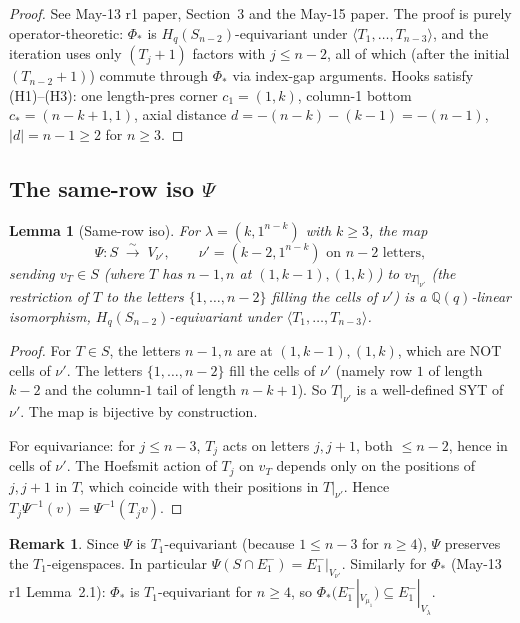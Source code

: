 \documentclass[11pt]{article}
\newtheorem{lemma}[theorem]{Lemma}
\theoremstyle{definition}
\newtheorem{remark}[theorem]{Remark}
\begin{document}
\begin{proof}
See May-13 r1 paper, Section~3 and the May-15 paper.  The proof is
purely operator-theoretic: $\Phi_*$ is $H_q(S_{n-2})$-equivariant under
$\langle T_1, \ldots, T_{n-3}\rangle$, and the iteration uses only
$(T_j+1)$ factors with $j \le n - 2$, all of which (after the initial
$(T_{n-2}+1)$) commute through $\Phi_*$ via index-gap arguments.
Hooks satisfy (H1)--(H3): one length-pres corner $c_1 = (1, k)$,
column-1 bottom $c_* = (n-k+1, 1)$, axial distance
$d = -(n - k) - (k - 1) = -(n - 1)$, $|d| = n - 1 \ge 2$ for $n \ge 3$.
\end{proof}

\subsection{The same-row iso $\Psi$}\label{sec:Psi}

\begin{lemma}[Same-row iso]\label{lem:Psi-iso}
For $\lambda = (k, 1^{n-k})$ with $k \ge 3$, the map
\[
   \Psi: S \;\xrightarrow{\sim}\; V_{\nu'}, \qquad \nu' = (k - 2, 1^{n-k})
   \text{ on } n - 2 \text{ letters},
\]
sending $v_T \in S$ (where $T$ has $n-1, n$ at $(1, k-1), (1, k)$) to
$v_{T|_{\nu'}}$ (the restriction of $T$ to the letters $\{1, \ldots, n-2\}$
filling the cells of $\nu'$) is a $\mathbb{Q}(q)$-linear isomorphism,
$H_q(S_{n-2})$-equivariant under $\langle T_1, \ldots, T_{n-3}\rangle$.
\end{lemma}

\begin{proof}
For $T \in S$, the letters $n-1, n$ are at $(1, k-1), (1, k)$, which are
NOT cells of $\nu'$.  The letters $\{1, \ldots, n-2\}$ fill the cells
of $\nu'$ (namely row $1$ of length $k - 2$ and the column-$1$ tail of
length $n - k + 1$).  So $T|_{\nu'}$ is a well-defined SYT of $\nu'$.
The map is bijective by construction.

For equivariance: for $j \le n - 3$, $T_j$ acts on letters $j, j+1$,
both $\le n - 2$, hence in cells of $\nu'$.  The Hoefsmit action of
$T_j$ on $v_T$ depends only on the positions of $j, j+1$ in $T$, which
coincide with their positions in $T|_{\nu'}$.  Hence
$T_j \Psi^{-1}(v) = \Psi^{-1}(T_j v)$.
\end{proof}

\begin{remark}\label{rem:E1-preservation}
Since $\Psi$ is $T_1$-equivariant (because $1 \le n - 3$ for $n \ge 4$),
$\Psi$ preserves the $T_1$-eigenspaces.  In particular $\Psi(S \cap E_1^-)
= E_1^-|_{V_{\nu'}}$.  Similarly for $\Phi_*$ (May-13 r1 Lemma~2.1):
$\Phi_*$ is $T_1$-equivariant for $n \ge 4$, so $\Phi_*(E_1^-|_{V_{\mu_1}})
\subseteq E_1^-|_{V_\lambda}$.
\end{remark}
\end{document}
